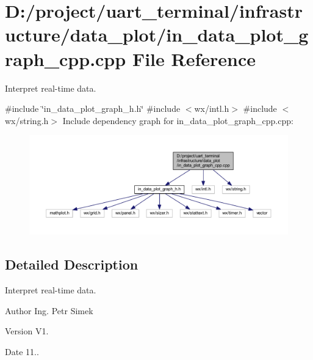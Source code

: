 \section{D\+:/project/uart\+\_\+terminal/infrastructure/data\+\_\+plot/in\+\_\+data\+\_\+plot\+\_\+graph\+\_\+cpp.cpp File Reference}
\label{in__data__plot__graph__cpp_8cpp}


Interpret real-\/time data.  


{\ttfamily \#include \char`\"{}in\+\_\+data\+\_\+plot\+\_\+graph\+\_\+h.\+h\char`\"{}}\newline
{\ttfamily \#include $<$wx/intl.\+h$>$}\newline
{\ttfamily \#include $<$wx/string.\+h$>$}\newline
Include dependency graph for in\+\_\+data\+\_\+plot\+\_\+graph\+\_\+cpp.\+cpp\+:
\nopagebreak
\begin{figure}[H]
\begin{center}
\leavevmode
\includegraphics[width=350pt]{in__data__plot__graph__cpp_8cpp__incl}
\end{center}
\end{figure}


\subsection{Detailed Description}
Interpret real-\/time data. 

\begin{DoxyAuthor}{Author}
Ing. Petr Simek 
\end{DoxyAuthor}
\begin{DoxyVersion}{Version}
V1. 
\end{DoxyVersion}
\begin{DoxyDate}{Date}
11.. 
\end{DoxyDate}
